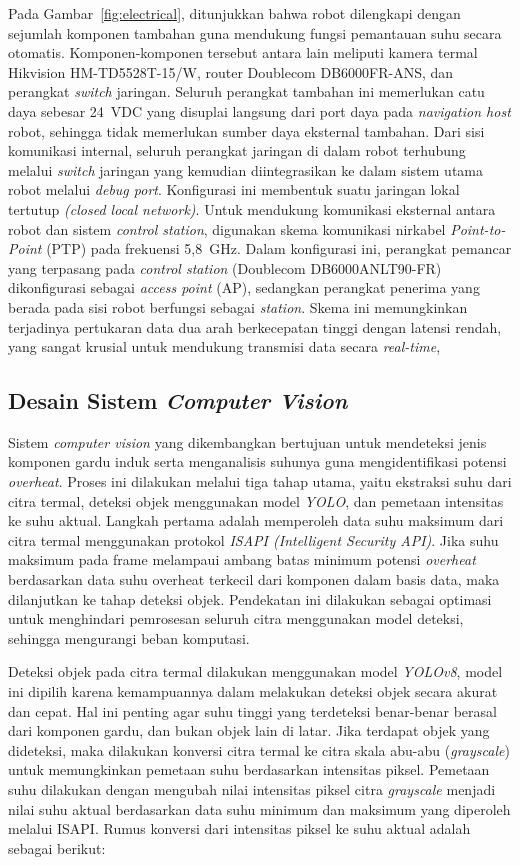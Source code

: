 Pada Gambar~\ref{fig:electrical}, ditunjukkan bahwa robot dilengkapi dengan sejumlah komponen tambahan guna mendukung fungsi pemantauan suhu secara otomatis. Komponen-komponen tersebut antara lain meliputi kamera termal Hikvision HM-TD5528T-15/W, router Doublecom DB6000FR-ANS, dan perangkat \emph{switch} jaringan. Seluruh perangkat tambahan ini memerlukan catu daya sebesar 24~VDC yang disuplai langsung dari port daya pada \emph{navigation host} robot, sehingga tidak memerlukan sumber daya eksternal tambahan. Dari sisi komunikasi internal, seluruh perangkat jaringan di dalam robot terhubung melalui \emph{switch} jaringan yang kemudian diintegrasikan ke dalam sistem utama robot melalui \emph{debug port}. Konfigurasi ini membentuk suatu jaringan lokal tertutup \emph{(closed local network)}. Untuk mendukung komunikasi eksternal antara robot dan sistem \emph{control station}, digunakan skema komunikasi nirkabel \emph{Point-to-Point} (PTP) pada frekuensi 5{,}8~GHz. Dalam konfigurasi ini, perangkat pemancar yang terpasang pada \emph{control station} (Doublecom DB6000ANLT90-FR) dikonfigurasi sebagai \emph{access point} (AP), sedangkan perangkat penerima yang berada pada sisi robot berfungsi sebagai \emph{station}. Skema ini memungkinkan terjadinya pertukaran data dua arah berkecepatan tinggi dengan latensi rendah, yang sangat krusial untuk mendukung transmisi data secara \emph{real-time}, 


\subsection{Desain Sistem \emph{Computer Vision}}

Sistem \emph{computer vision} yang dikembangkan bertujuan untuk mendeteksi jenis komponen gardu induk serta menganalisis suhunya guna mengidentifikasi potensi \emph{overheat}. Proses ini dilakukan melalui tiga tahap utama, yaitu ekstraksi suhu dari citra termal, deteksi objek menggunakan model \emph{YOLO}, dan pemetaan intensitas ke suhu aktual. Langkah pertama adalah memperoleh data suhu maksimum dari citra termal menggunakan protokol \emph{ISAPI (Intelligent Security API)}. Jika suhu maksimum pada frame melampaui ambang batas minimum potensi \emph{overheat} berdasarkan data suhu overheat terkecil dari komponen dalam basis data, maka dilanjutkan ke tahap deteksi objek. Pendekatan ini dilakukan sebagai optimasi untuk menghindari pemrosesan seluruh citra menggunakan model deteksi, sehingga mengurangi beban komputasi. 

Deteksi objek pada citra termal dilakukan menggunakan model \emph{YOLOv8}, model ini dipilih karena kemampuannya dalam melakukan deteksi objek secara akurat dan cepat. Hal ini penting agar suhu tinggi yang terdeteksi benar-benar berasal dari komponen gardu, dan bukan objek lain di latar. Jika terdapat objek yang dideteksi, maka dilakukan konversi citra termal ke citra skala abu-abu (\emph{grayscale}) untuk memungkinkan pemetaan suhu berdasarkan intensitas piksel. Pemetaan suhu dilakukan dengan mengubah nilai intensitas piksel citra \emph{grayscale} menjadi nilai suhu aktual berdasarkan data suhu minimum dan maksimum yang diperoleh melalui ISAPI. Rumus konversi dari intensitas piksel ke suhu aktual adalah sebagai berikut:

